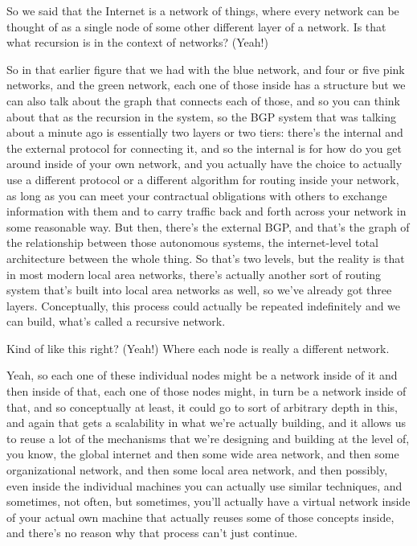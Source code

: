 So we said that the Internet is a network of things, where every network can be thought of as a single node of some other different layer of a network. Is that what recursion is in the context of networks? (Yeah!)

So in that earlier figure that we had with the blue network, and four or five pink networks, and the green network, each one of those inside has a structure but we can also talk about the graph that connects each of those, and so you can think about that as the recursion in the system, so the BGP system that was talking about a minute ago is essentially two layers or two tiers: there's the internal and the external protocol for connecting it, and so the internal is for how do you get around inside of your own network, and you actually have the choice to actually use a different protocol or a different algorithm for routing inside your network, as long as you can meet your contractual obligations with others to exchange information with them and to carry traffic back and forth across your network in some reasonable way. But then, there's the external BGP, and that's the graph of the relationship between those autonomous systems, the internet-level total architecture between the whole thing. So that's two levels, but the reality is that in most modern local area networks, there's actually another sort of routing system that's built into local area networks as well, so we've already got three layers. Conceptually, this process could actually be repeated indefinitely and we can build, what's called a recursive network.

Kind of like this right? (Yeah!) Where each node is really a different network.

Yeah, so each one of these individual nodes might be a network inside of it and then inside of that, each one of those nodes might, in turn be a network inside of that, and so conceptually at least, it could go to sort of arbitrary depth in this, and again that gets a scalability in what we're actually building, and it allows us to reuse a lot of the mechanisms that we're designing and building at the level of, you know, the global internet and then some wide area network, and then some organizational network, and then some local area network, and then possibly, even inside the individual machines you can actually use similar techniques, and sometimes, not often, but sometimes, you'll actually have a virtual network inside of your actual own machine that actually reuses some of those concepts inside, and there's no reason why that process can't just continue.

